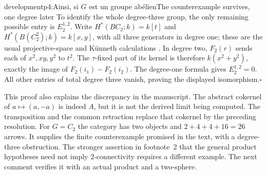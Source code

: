 \begin{dcomment}{development}{p4:Ainsi, si $G$ est un groupe abélien}{The counterexample survives, one degree later}
To identify the whole degree-three group, the only remaining possible entry is $E_2^{1,2}$. Write $H^*(BC_2;k)=k[t]$ and $H^*(B(C_2^2);k)=k[x,y]$, with all three generators in degree one; these are the usual projective-space and K\"unneth calculations \citep[Theorems 3.15 and 3.19]{Hatcher2002}. In degree two, $F_2(r)$ sends each of $x^2,xy,y^2$ to $t^2$. The $\tau$-fixed part of its kernel is therefore $k(x^2+y^2)$, exactly the image of $F_2(i_1)-F_2(i_2)$. The degree-one formula gives $E_2^{1,2}=0$. All other entries of total degree three vanish, proving the displayed isomorphism.\hfill$\square$

This proof also explains the discrepancy in the manuscript. The abstract cokernel of $a\mapsto(a,-a)$ is indeed $A$, but it is not the derived limit being computed. The transposition and the common retraction replace that cokernel by the preceding resolution. For $G=C_2$ the category has two objects and $2+4+4+16=26$ arrows. It supplies the finite counterexample promised in the text, with a degree-three obstruction. The stronger assertion in footnote~2 that the general product hypotheses need not imply $2$-connectivity requires a different example. The next comment verifies it with an actual product and a two-sphere.
\end{dcomment}


